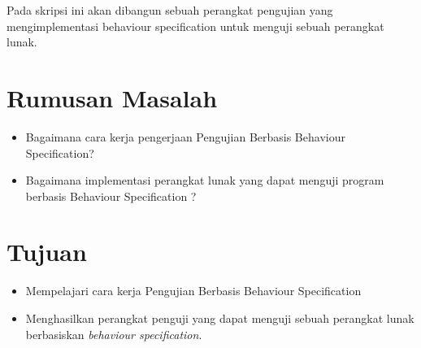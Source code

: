 \documentclass[a4paper,twoside]{article}
\begin{document}
Pada skripsi ini akan dibangun sebuah perangkat pengujian yang mengimplementasi behaviour specification untuk menguji sebuah perangkat lunak.
\section{Rumusan Masalah}
\begin{itemize}
\item Bagaimana cara kerja pengerjaan Pengujian Berbasis Behaviour Specification?
\item Bagaimana implementasi perangkat lunak yang dapat menguji program berbasis Behaviour Specification ?	
\end{itemize}
\section{Tujuan}
\begin{itemize}
\item Mempelajari cara kerja Pengujian Berbasis Behaviour Specification
\item Menghasilkan perangkat penguji yang dapat menguji sebuah perangkat lunak berbasiskan \textit{behaviour specification}.
\end{itemize}
\end{document}

